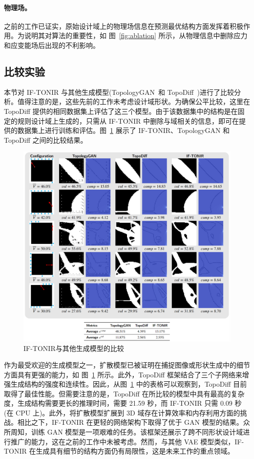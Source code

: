 \paragraph{物理场。}
之前的工作已证实，原始设计域上的物理场信息在预测最优结构方面发挥着积极作用。为说明其对算法的重要性，如 图~\ref{fig:ablation} 所示，从物理信息中删除应力和应变能场后出现的不利影响。

\subsection{比较实验}
本节对 IF-TONIR 与其他生成模型(TopologyGAN~\cite{topologygan2021}和 TopoDiff~\cite{maze2022})进行了比较分析。值得注意的是，这些先前的工作未考虑设计域形状。为确保公平比较，这里在 TopoDiff 提供的相同数据集上评估了这三个模型。由于该数据集中的结构是在固定的规则设计域上生成的，只需从 IF-TONIR 中删除与域相关的信息，即可在提供的数据集上进行训练和评估。图~\ref{fig:comparison} 展示了 IF-TONIR、TopologyGAN 和 TopoDiff 之间的比较结果。
\begin{figure}
    \centering
    \includegraphics[width=0.95\linewidth]{./figures/TONIR/results-comparison.png}
    \caption{IF-TONIR与其他生成模型的比较}
    \label{fig:comparison}
\end{figure}

作为最受欢迎的生成模型之一，扩散模型已被证明在捕捉图像或形状生成中的细节方面具有更强的能力，如 图~\ref{fig:comparison} 所示。此外，TopoDiff 框架结合了三个子网络来增强生成结构的强度和连续性。因此，从图~\ref{fig:comparison} 中的表格可以观察到，TopoDiff 目前取得了最佳性能。但需要注意的是，TopoDiff 在所比较的模型中具有最高的复杂度，生成结构需要更长的推理时间，需要 21.59 秒，而 IF-TONIR 只需 0.09 秒(在 CPU 上)。此外，将扩散模型扩展到 3D 域存在计算效率和内存利用方面的挑战。相比之下，IF-TONIR 在更轻的网络架构下取得了优于 GAN 模型的结果。众所周知，训练 GAN 模型是一项艰难的任务。该框架还展示了跨不同形状设计域进行推广的能力，这在之前的工作中未被考虑。然而，与其他 VAE 模型类似，IF-TONIR 在生成具有细节的结构方面仍有局限性，这是未来工作的重点领域。

